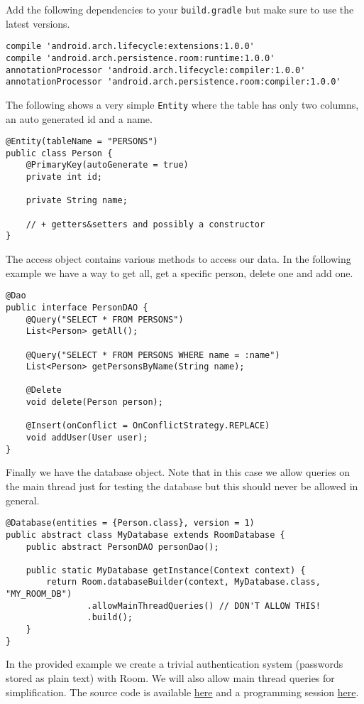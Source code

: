 Add the following dependencies to your \texttt{build.gradle} but make sure to use the latest versions.
\begin{lstlisting}[style=A_txt]
compile 'android.arch.lifecycle:extensions:1.0.0'
compile 'android.arch.persistence.room:runtime:1.0.0'
annotationProcessor 'android.arch.lifecycle:compiler:1.0.0'
annotationProcessor 'android.arch.persistence.room:compiler:1.0.0'
\end{lstlisting}
The following shows a very simple \texttt{Entity} where the table has only two columns, an auto generated id and a name.
\begin{lstlisting}[style=A_Java]
@Entity(tableName = "PERSONS")
public class Person {
    @PrimaryKey(autoGenerate = true)
    private int id;

    private String name;

    // + getters&setters and possibly a constructor
}
\end{lstlisting}
The access object contains various methods to access our data. In the following example we have a way to get all, get a specific person, delete one and add one.
\begin{lstlisting}[style=A_Java]
@Dao
public interface PersonDAO {
    @Query("SELECT * FROM PERSONS")
    List<Person> getAll();

    @Query("SELECT * FROM PERSONS WHERE name = :name")
    List<Person> getPersonsByName(String name);

    @Delete
    void delete(Person person);

    @Insert(onConflict = OnConflictStrategy.REPLACE)
    void addUser(User user);
}
\end{lstlisting}
Finally we have the database object. Note that in this case we allow queries on the main thread just for testing the database but this should never be allowed in general.
\begin{lstlisting}[style=A_Java]
@Database(entities = {Person.class}, version = 1)
public abstract class MyDatabase extends RoomDatabase {
    public abstract PersonDAO personDao();

    public static MyDatabase getInstance(Context context) {
        return Room.databaseBuilder(context, MyDatabase.class, "MY_ROOM_DB")
                .allowMainThreadQueries() // DON'T ALLOW THIS!
                .build();
    }
}
\end{lstlisting}
In the provided example we create a trivial authentication system (passwords stored as plain text) with Room. We will also allow main thread queries for simplification. The source code is available \href{https://github.com/JonSteinn/AndroidDevelopment/tree/master/examples/lab5/roomdb}{here} and a programming session \href{https://www.youtube.com/watch?v=rUy52GqcIqs}{here}.

